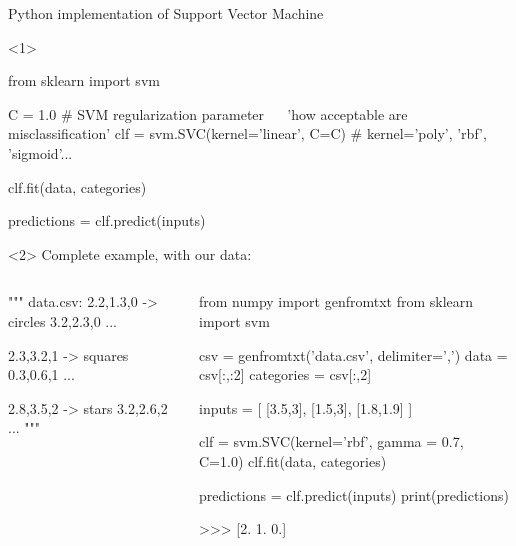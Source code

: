 \documentclass[compress]{beamer}
\begin{document}
\begin{frame}[fragile]{Python implementation of Support Vector Machine}

\begin{onlyenv}<1>

\begin{pythoncode}
from sklearn import svm

C = 1.0  # SVM regularization parameter ~~ 'how acceptable are misclassification'
clf = svm.SVC(kernel='linear', C=C) # kernel='poly', 'rbf', 'sigmoid'...

clf.fit(data, categories)

predictions = clf.predict(inputs)
\end{pythoncode}

\end{onlyenv}

\begin{onlyenv}<2>
    Complete example, with our data:

\begin{columns}
    \begin{column}{0.4\linewidth}
\begin{pythoncode}
""" data.csv:
2.2,1.3,0 -> circles
3.2,2.3,0
...

2.3,3.2,1 -> squares
0.3,0.6,1
...

2.8,3.5,2 -> stars
3.2,2.6,2
...
"""
\end{pythoncode}
        
    \end{column}
    \begin{column}{0.6\linewidth}
\begin{pythoncode}
from numpy import genfromtxt
from sklearn import svm

csv = genfromtxt('data.csv', delimiter=',')
data = csv[:,:2]
categories = csv[:,2]


inputs = [ [3.5,3], [1.5,3], [1.8,1.9] ]

clf = svm.SVC(kernel='rbf',
              gamma = 0.7,
              C=1.0)
clf.fit(data, categories)

predictions = clf.predict(inputs)
print(predictions)

>>>  [2.  1.  0.]

\end{pythoncode}
    \end{column}
\end{columns}

\end{onlyenv}


\end{frame}
\end{document}
